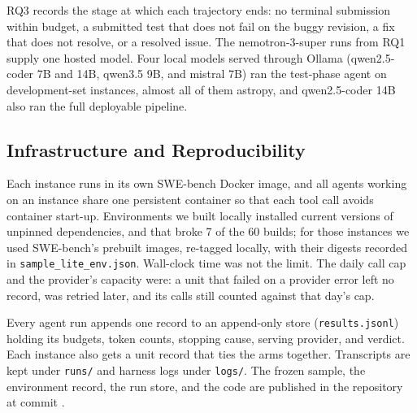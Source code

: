 RQ3 records the stage at which each trajectory ends: no terminal submission
within budget, a submitted test that does not fail on the buggy revision, a
fix that does not resolve, or a resolved issue. The nemotron-3-super runs from
RQ1 supply one hosted model. Four local models served through Ollama
(qwen2.5-coder 7B and 14B, qwen3.5 9B, and mistral 7B) ran the test-phase
agent on development-set instances, almost all of them astropy, and
qwen2.5-coder 14B also ran the full deployable pipeline.

\subsection{Infrastructure and Reproducibility}
\label{sec:exp-budget}

Each instance runs in its own SWE-bench Docker image, and all agents working
on an instance share one persistent container so that each tool call avoids
container start-up. Environments we built locally installed current versions
of unpinned dependencies, and that broke 7 of the 60 builds; for those
instances we used SWE-bench's prebuilt images, re-tagged locally, with their
digests recorded in \texttt{sample\_lite\_env.json}. Wall-clock time was not
the limit. The daily call cap and the provider's capacity were: a unit that
failed on a provider error left no record, was retried later, and its calls
still counted against that day's cap.

Every agent run appends one record to an append-only store
(\texttt{results.jsonl}) holding its budgets, token counts, stopping cause,
serving provider, and verdict. Each instance also gets a unit record that ties
the arms together. Transcripts are kept under \texttt{runs/} and harness logs
under \texttt{logs/}. The frozen sample, the environment record, the run store,
and the code are published in the repository at commit .
